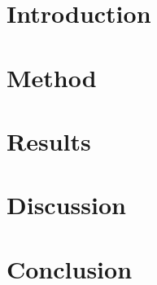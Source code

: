 \section{Introduction} 
\section{Method}
\section{Results}



\section{Discussion}

\section{Conclusion}
